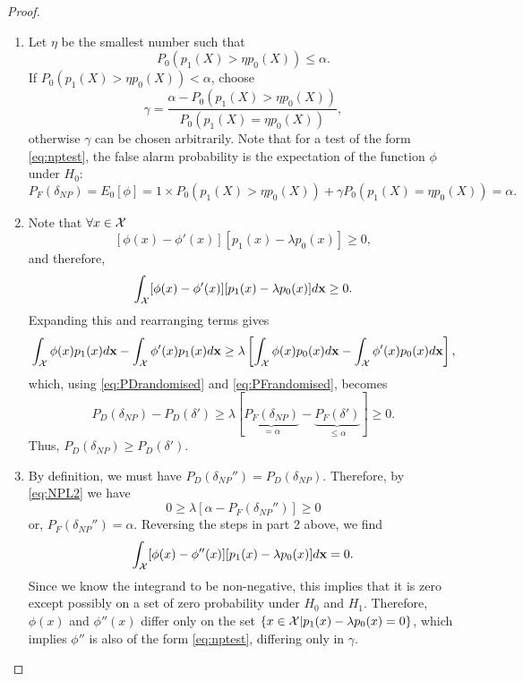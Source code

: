\begin{proof}

\begin{enumerate}
\item Let $\eta$ be the smallest number such that 
\begin{equation}
P_0(p_1(X)>\eta p_0(X)) \leq \alpha.
\end{equation}
If $P_0(p_1(X)>\eta p_0(X)) < \alpha$, choose 
\begin{equation}
\gamma=\frac{\alpha-P_0(p_1(X)>\eta p_0(X))}{P_0(p_1(X)=\eta p_0(X))},
\end{equation}
otherwise $\gamma$ can be chosen arbitrarily. Note that for a test of the form \ref{eq:nptest}, the false alarm probability is the expectation of the function $\phi$ under $H_0$:
\begin{equation}
P_F(\delta_{NP})=E_0[\phi]=1\times P_0(p_1(X)>\eta p_0(X))+\gamma P_0(p_1(X)=\eta p_0(X)) =\alpha.
\end{equation}
\item Note that $\forall x \in \mathcal{X}$
\[ [\phi(x) - \phi'(x)][p_1(x)-\lambda p_0(x)]\geq 0, \]
and therefore,
\begin{equation}
\int_{\mathcal{X}} [\phi(x) - \phi'(x)][p_1(x)-\lambda p_0(x)] d\mathbf{x} \geq 0.
\end{equation}
Expanding this and rearranging terms gives 
\begin{equation}
\int_{\mathcal{X}}\phi(x) p_1(x) d\mathbf{x} - \int_{\mathcal{X}}\phi'(x) p_1(x) d\mathbf{x} \geq \lambda \left[ \int_{\mathcal{X}} \phi(x)p_0(x) d\mathbf{x} - \int_{\mathcal{X}}\phi'(x)p_0(x) d\mathbf{x} \right],
\end{equation}
which, using \ref{eq:PDrandomised} and \ref{eq:PFrandomised}, becomes
\begin{equation}\label{eq:NPL2}
P_D(\delta_{NP}) - P_D(\delta') \geq \lambda \left[\underbrace{P_F(\delta_{NP})}_{=\alpha} - \underbrace{P_F(\delta')}_{\leq \alpha} \right]\geq 0.
\end{equation}
Thus, $P_D(\delta_{NP}) \geq P_D(\delta')$. 
\item By definition, we must have $P_D(\delta_{NP}'')=P_D(\delta_{NP})$. Therefore, by \ref{eq:NPL2} we have
\begin{equation}
0 \geq \lambda \left[ \alpha - P_F(\delta_{NP}'') \right]\geq 0
\end{equation}
or, $P_F(\delta_{NP}'')=\alpha$. Reversing the steps in part 2 above, we find
\begin{equation}
\int_{\mathcal{X}} [\phi(x) - \phi''(x)][p_1(x)-\lambda p_0(x)] d\mathbf{x} = 0.
\end{equation}
Since we know the integrand to be non-negative, this implies that it is zero except possibly on a set of zero probability under $H_0$ and $H_1$. Therefore, $\phi(x)$ and $\phi''(x)$ differ only on the set $\{x \in \mathcal{X} | p_1(x)-\lambda p_0(x)=0 \}$, which implies $\phi''$ is also of the form \ref{eq:nptest}, differing only in $\gamma$.
\end{enumerate}
\end{proof}

